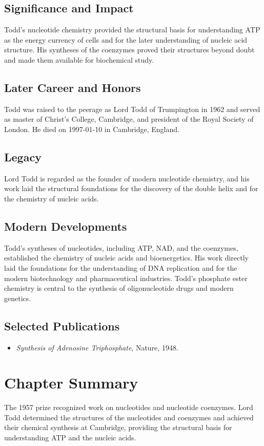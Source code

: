 \subsection*{Significance and Impact}

Todd's nucleotide chemistry provided the structural basis for understanding ATP as the energy currency of cells and for the later understanding of nucleic acid structure. His syntheses of the coenzymes proved their structures beyond doubt and made them available for biochemical study.

\subsection*{Later Career and Honors}

Todd was raised to the peerage as Lord Todd of Trumpington in 1962 and served as master of Christ's College, Cambridge, and president of the Royal Society of London. He died on 1997-01-10 in Cambridge, England.

\subsection*{Legacy}

Lord Todd is regarded as the founder of modern nucleotide chemistry, and his work laid the structural foundations for the discovery of the double helix and for the chemistry of nucleic acids.

\subsection*{Modern Developments}

Todd's syntheses of nucleotides, including ATP, NAD, and the coenzymes, established the chemistry of nucleic acids and bioenergetics. His work directly laid the foundations for the understanding of DNA replication and for the modern biotechnology and pharmaceutical industries. Todd's phosphate ester chemistry is central to the synthesis of oligonucleotide drugs and modern genetics.

\subsection*{Selected Publications}

\begin{itemize}

\item \emph{Synthesis of Adenosine Triphosphate}, Nature, 1948.

\end{itemize}

\clearpage

\section*{Chapter Summary}

The 1957 prize recognized work on nucleotides and nucleotide coenzymes. Lord Todd determined the structures of the nucleotides and coenzymes and achieved their chemical synthesis at Cambridge, providing the structural basis for understanding ATP and the nucleic acids.

